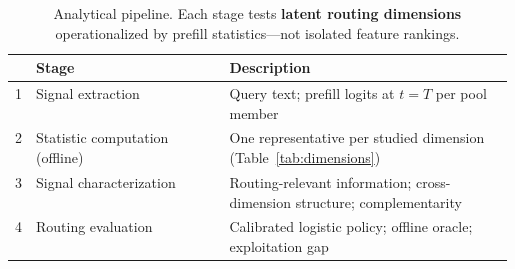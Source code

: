\begin{table}[t]
  \centering
  \small
  \begin{tabular}{@{}clp{0.58\linewidth}@{}}
    \toprule
    & \textbf{Stage} & \textbf{Description} \\
    \midrule
    1 & Signal extraction &
    Query text; prefill logits at $t{=}T$ per pool member \\
    2 & Statistic computation (offline) &
    One representative per studied dimension (Table~\ref{tab:dimensions}) \\
    3 & Signal characterization &
    Routing-relevant information; cross-dimension structure; complementarity \\
    4 & Routing evaluation &
    Calibrated logistic policy; offline oracle; exploitation gap \\
    \bottomrule
  \end{tabular}
  \caption{Analytical pipeline. Each stage tests \textbf{latent routing dimensions} operationalized by prefill statistics---not isolated feature rankings.}
  \label{tab:pipeline}
\end{table}
